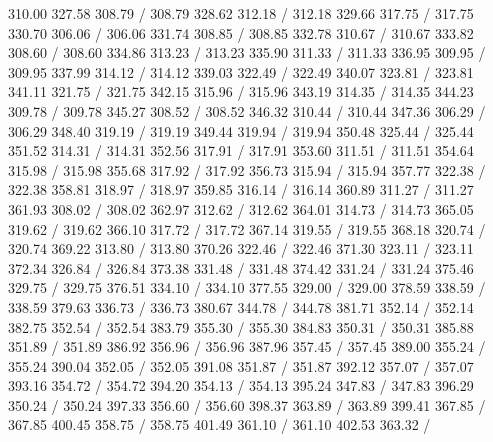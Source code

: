 { 310.00 327.58 308.79 /
 308.79 328.62 312.18 /
 312.18 329.66 317.75 /
 317.75 330.70 306.06 /
 306.06 331.74 308.85 /
 308.85 332.78 310.67 /
 310.67 333.82 308.60 /
 308.60 334.86 313.23 /
 313.23 335.90 311.33 /
 311.33 336.95 309.95 /
 309.95 337.99 314.12 /
 314.12 339.03 322.49 /
 322.49 340.07 323.81 /
 323.81 341.11 321.75 /
 321.75 342.15 315.96 /
 315.96 343.19 314.35 /
 314.35 344.23 309.78 /
 309.78 345.27 308.52 /
 308.52 346.32 310.44 /
 310.44 347.36 306.29 /
 306.29 348.40 319.19 /
 319.19 349.44 319.94 /
 319.94 350.48 325.44 /
 325.44 351.52 314.31 /
 314.31 352.56 317.91 /
 317.91 353.60 311.51 /
 311.51 354.64 315.98 /
 315.98 355.68 317.92 /
 317.92 356.73 315.94 /
 315.94 357.77 322.38 /
 322.38 358.81 318.97 /
 318.97 359.85 316.14 /
 316.14 360.89 311.27 /
 311.27 361.93 308.02 /
 308.02 362.97 312.62 /
 312.62 364.01 314.73 /
 314.73 365.05 319.62 /
 319.62 366.10 317.72 /
 317.72 367.14 319.55 /
 319.55 368.18 320.74 /
 320.74 369.22 313.80 /
 313.80 370.26 322.46 /
 322.46 371.30 323.11 /
 323.11 372.34 326.84 /
 326.84 373.38 331.48 /
 331.48 374.42 331.24 /
 331.24 375.46 329.75 /
 329.75 376.51 334.10 /
 334.10 377.55 329.00 /
 329.00 378.59 338.59 /
 338.59 379.63 336.73 /
 336.73 380.67 344.78 /
 344.78 381.71 352.14 /
 352.14 382.75 352.54 /
 352.54 383.79 355.30 /
 355.30 384.83 350.31 /
 350.31 385.88 351.89 /
 351.89 386.92 356.96 /
 356.96 387.96 357.45 /
 357.45 389.00 355.24 /
 355.24 390.04 352.05 /
 352.05 391.08 351.87 /
 351.87 392.12 357.07 /
 357.07 393.16 354.72 /
 354.72 394.20 354.13 /
 354.13 395.24 347.83 /
 347.83 396.29 350.24 /
 350.24 397.33 356.60 /
 356.60 398.37 363.89 /
 363.89 399.41 367.85 /
 367.85 400.45 358.75 /
 358.75 401.49 361.10 /
 361.10 402.53 363.32 /
}
